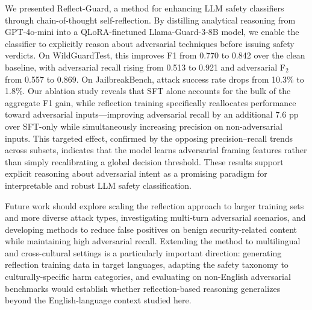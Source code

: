 \documentclass[11pt]{article}
\begin{document}
We presented Reflect-Guard, a method for enhancing LLM safety classifiers through chain-of-thought self-reflection. By distilling analytical reasoning from GPT-4o-mini into a QLoRA-finetuned Llama-Guard-3-8B model, we enable the classifier to explicitly reason about adversarial techniques before issuing safety verdicts. On WildGuardTest, this improves F1 from 0.770 to 0.842 over the clean baseline, with adversarial recall rising from 0.513 to 0.921 and adversarial F$_2$ from 0.557 to 0.869. On JailbreakBench, attack success rate drops from 10.3\% to 1.8\%. Our ablation study reveals that SFT alone accounts for the bulk of the aggregate F1 gain, while reflection training specifically reallocates performance toward adversarial inputs---improving adversarial recall by an additional 7.6 pp over SFT-only while simultaneously increasing precision on non-adversarial inputs. This targeted effect, confirmed by the opposing precision--recall trends across subsets, indicates that the model learns adversarial framing features rather than simply recalibrating a global decision threshold. These results support explicit reasoning about adversarial intent as a promising paradigm for interpretable and robust LLM safety classification.

Future work should explore scaling the reflection approach to larger training sets and more diverse attack types, investigating multi-turn adversarial scenarios, and developing methods to reduce false positives on benign security-related content while maintaining high adversarial recall. Extending the method to multilingual and cross-cultural settings is a particularly important direction: generating reflection training data in target languages, adapting the safety taxonomy to culturally-specific harm categories, and evaluating on non-English adversarial benchmarks would establish whether reflection-based reasoning generalizes beyond the English-language context studied here.



\end{document}

